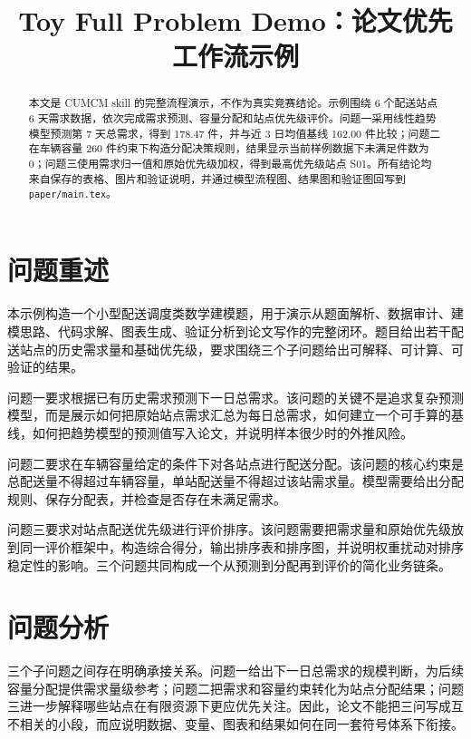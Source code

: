 \documentclass[12pt]{ctexart}
\title{Toy Full Problem Demo：论文优先工作流示例}
\author{}
\date{}
\begin{document}
\maketitle

\begin{abstract}
本文是 CUMCM skill 的完整流程演示，不作为真实竞赛结论。示例围绕 6 个配送站点 6 天需求数据，依次完成需求预测、容量分配和站点优先级评价。问题一采用线性趋势模型预测第 7 天总需求，得到 178.47 件，并与近 3 日均值基线 162.00 件比较；问题二在车辆容量 260 件约束下构造分配决策规则，结果显示当前样例数据下未满足件数为 0；问题三使用需求归一值和原始优先级加权，得到最高优先级站点 S01。所有结论均来自保存的表格、图片和验证说明，并通过模型流程图、结果图和验证图回写到 \texttt{paper/main.tex}。
\end{abstract}

\section{问题重述}

本示例构造一个小型配送调度类数学建模题，用于演示从题面解析、数据审计、建模思路、代码求解、图表生成、验证分析到论文写作的完整闭环。题目给出若干配送站点的历史需求量和基础优先级，要求围绕三个子问题给出可解释、可计算、可验证的结果。

问题一要求根据已有历史需求预测下一日总需求。该问题的关键不是追求复杂预测模型，而是展示如何把原始站点需求汇总为每日总需求，如何建立一个可手算的基线，如何把趋势模型的预测值写入论文，并说明样本很少时的外推风险。

问题二要求在车辆容量给定的条件下对各站点进行配送分配。该问题的核心约束是总配送量不得超过车辆容量，单站配送量不得超过该站需求量。模型需要给出分配规则、保存分配表，并检查是否存在未满足需求。

问题三要求对站点配送优先级进行评价排序。该问题需要把需求量和原始优先级放到同一评价框架中，构造综合得分，输出排序表和排序图，并说明权重扰动对排序稳定性的影响。三个问题共同构成一个从预测到分配再到评价的简化业务链条。

\section{问题分析}

三个子问题之间存在明确承接关系。问题一给出下一日总需求的规模判断，为后续容量分配提供需求量级参考；问题二把需求和容量约束转化为站点分配结果；问题三进一步解释哪些站点在有限资源下更应优先关注。因此，论文不能把三问写成互不相关的小段，而应说明数据、变量、图表和结果如何在同一套符号体系下衔接。
\end{document}
